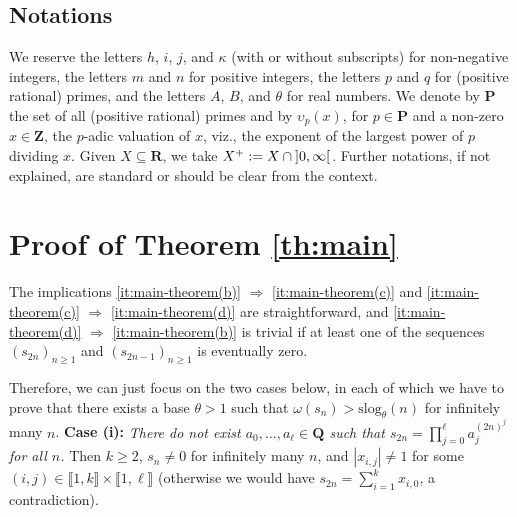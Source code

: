\documentclass[reqno]{amsart}
\theoremstyle{remark}
\providecommand{\QQb}{\mathbf{Q}}
\providecommand{\RRb}{\mathbf{R}}
\providecommand\llb{\llbracket}
\providecommand\rrb{\rrbracket}
\newcommand{\slog}{\mathrm{slog}}
\newcommand{\fixed}[2][1]{%
  \begingroup
  \spaceskip=#1\fontdimen2\font minus \fontdimen4\font
  \xspaceskip=0pt\relax
  #2%
  \endgroup
}
\begin{document}
\subsection*{Notations} We reserve the letters $h$, $i$, $j$, and $\kappa$ (with or without subscripts) for non-negative integers, the letters $m$ and $n$ for positive integers, the letters $p$ and $q$ for (positive rational) primes, and the letters $A$, $B$, and $\theta$ for real numbers. We denote by $\mathbf P$ the set of all (positive rational) primes and by $\upsilon_p(x)$, for $p \in \mathbf P$ and a non-zero $x \in \mathbf Z$, the $p$-adic valuation of $x$, viz., the exponent of the largest power of $p$ dividing $x$. Given $X \subseteq \RRb$, we take $X^+ := X \cap {]0,\infty[}\fixed[0.2]{\text{ }}$. Further notations, if not explained, are standard or should be clear from the context.
%
%
\section{Proof of Theorem \texorpdfstring{\ref{th:main}}{1}}
\label{sec:proof}
%
The implications \ref{it:main-theorem(b)} $\Rightarrow$ \ref{it:main-theorem(c)} and \ref{it:main-theorem(c)} $\Rightarrow$ \ref{it:main-theorem(d)} are straightforward, and \ref{it:main-theorem(d)} $\Rightarrow$ \ref{it:main-theorem(b)} is trivial if at least one of the sequences $(s_{2n})_{n \ge 1}$ and $(s_{2n-1})_{n \ge 1}$ is eventually zero.

Therefore, we can just focus on the two cases below, in each of which we have to prove that there exists a base $\theta > 1$ such that $\omega(s_n) > \slog_\theta(n)$ for infinitely many $n$.
%
\vskip 0.3cm
\noindent{}\textbf{Case (i):} \textit{There do not exist $a_0, \ldots, a_\ell \in \QQb$ such that $s_{2n} = \prod_{j=0}^\ell a_j^{(2n)^j}$ for all $n$.} Then $k \ge 2$, $s_n \ne 0$ for infinitely many $n$, and $|x_{i,j}| \ne 1$ for some $(i,j) \in \llb 1, k \rrb \times \llb 1, \ell \rrb$ (otherwise we would have $s_{2n} = \sum_{i=1}^k x_{i,0}$, a contradiction).
\end{document}
